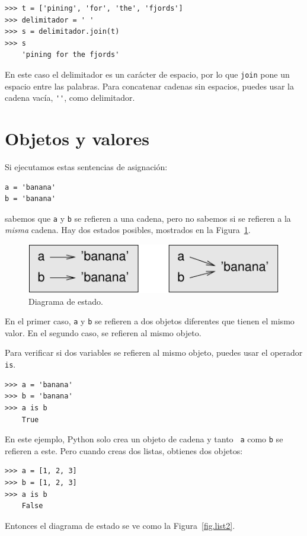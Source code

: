 \documentclass[10pt]{book}
\begin{document}
\begin{verbatim}
>>> t = ['pining', 'for', 'the', 'fjords']
>>> delimitador = ' '
>>> s = delimitador.join(t)
>>> s
    'pining for the fjords'
\end{verbatim}
%
En este caso el delimitador es un carácter de espacio, por lo que
{\tt join} pone un espacio entre las palabras.  Para concatenar
cadenas sin espacios, puedes usar la cadena vacía,
\verb"''", como delimitador.


\section{Objetos y valores}
\label{equivalence}

Si ejecutamos estas sentencias de asignación:

\begin{verbatim}
a = 'banana'
b = 'banana'
\end{verbatim}
%
sabemos que {\tt a} y {\tt b} se refieren a una
cadena, pero no
sabemos si se refieren a la {\em misma} cadena.
Hay dos estados posibles, mostrados en la Figura~\ref{fig.list1}.

\begin{figure}
\centerline
{\includegraphics[scale=0.8]{figs/list1.pdf}}
\caption{Diagrama de estado.}
\label{fig.list1}
\end{figure}

En el primer caso, {\tt a} y {\tt b} se refieren a dos objetos diferentes que
tienen el mismo valor.  En el segundo caso, se refieren al mismo
objeto.

Para verificar si dos variables se refieren al mismo objeto, puedes
usar el operador {\tt is}.

\begin{verbatim}
>>> a = 'banana'
>>> b = 'banana'
>>> a is b
    True
\end{verbatim}
%
En este ejemplo, Python solo crea un objeto de cadena y tanto {\tt
  a} como {\tt b} se refieren a este.  Pero cuando creas dos listas, obtienes
dos objetos:

\begin{verbatim}
>>> a = [1, 2, 3]
>>> b = [1, 2, 3]
>>> a is b
    False
\end{verbatim}
%
Entonces el diagrama de estado se ve como la Figura~\ref{fig.list2}.
\end{document}
